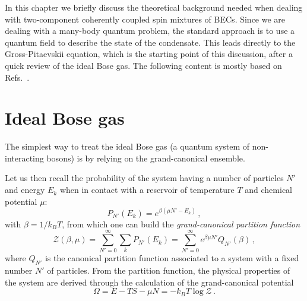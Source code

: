 In this chapter we briefly discuss the theoretical background needed when dealing with two-component coherently coupled spin mixtures of BECs. Since we are dealing with a many-body quantum problem, the standard approach is to use a quantum field to describe the state of the condensate. This leads directly to the Gross-Pitaevskii equation, which is the starting point of this discussion, after a quick review of the ideal Bose gas. The following content is mostly based on Refs.\ \cite{pitaevskii2016bose, lamporesi2023two}.

\section{Ideal Bose gas}
The simplest way to treat the ideal Bose gas (a quantum system of non-interacting bosons) is by relying on the grand-canonical ensemble. 

Let us then recall the probability of the system having a number of particles $N'$ and energy $E_k$ when in contact with a reservoir of temperature $T$ and chemical potential $\mu$:
\begin{equation*}
    P_{N'}(E_k) = e^{\beta(\mu N' - E_k)}\, ,
\end{equation*}
with $\beta = 1/k_B T$, from which one can build the \emph{grand-canonical partition function}
\begin{equation}
    \mathcal{Z}(\beta, \mu) = \sum_{N' = 0}^\infty \sum_k P_{N'}(E_k) = \sum_{N' = 0}^\infty e^{\beta \mu N'} Q_{N'}(\beta)\, ,
    \label{eq:part_func}
\end{equation}
where $Q_{N'}$ is the canonical partition function associated to a system with a fixed number $N'$ of particles. From the partition function, the physical properties of the system are derived through the calculation of the grand-canonical potential 
\begin{equation}
    \Omega = E - T S - \mu N = -k_B T \log\mathcal{Z}\, .
    \label{eq:GC_potential}
\end{equation}

